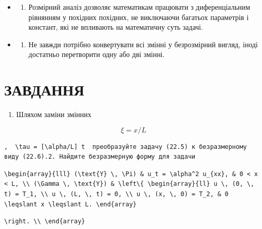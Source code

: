 \documentclass[
  ukrainian,
]{article}
\providecommand{\tightlist}{%
  \setlength{\itemsep}{0pt}\setlength{\parskip}{0pt}}
\begin{document}
\begin{itemize}
\tightlist
\item
  \begin{enumerate}
  \def\labelenumi{\arabic{enumi}.}
  \setcounter{enumi}{1}
  \tightlist
  \item
    Розмірний аналіз дозволяє математикам працювати з диференціальним
    рівнянням у похідних похідних, не виключаючи багатьох параметрів і
    констант, які не впливають на математичну суть задачі.
  \end{enumerate}
\item
  \begin{enumerate}
  \def\labelenumi{\arabic{enumi}.}
  \setcounter{enumi}{2}
  \tightlist
  \item
    Не завжди потрібно конвертувати всі змінні у безрозмірний вигляд,
    іноді достатньо перетворити одну або дві змінні.
  \end{enumerate}
\end{itemize}

\section{ЗАВДАННЯ}\label{ux437ux430ux432ux434ux430ux43dux43dux44f}

\begin{enumerate}
\def\labelenumi{\arabic{enumi}.}
\tightlist
\item
  Шляхом заміни змінних
\end{enumerate}

\[
\xi = x/L
\]

\begin{verbatim}
,  \tau = [\alpha/L] t  преобразуйте задачу (22.5) к безразмерному виду (22.6).2. Найдите безразмерную форму для задачи
\end{verbatim}

\begin{verbatim}
\begin{array}{lll} (\text{Y} \, \Pi) & u_t = \alpha^2 u_{xx}, & 0 < x < L, \\ (\Gamma \, \text{Y}) & \left\{ \begin{array}{ll} u \, (0, \, t) = T_1, \\ u \, (L, \, t) = 0, \\ u \, (x, \, 0) = T_2, & 0 \leqslant x \leqslant L. \end{array}
\end{verbatim}

\begin{verbatim}
\right. \\ \end{array}
\end{verbatim}
\end{document}
